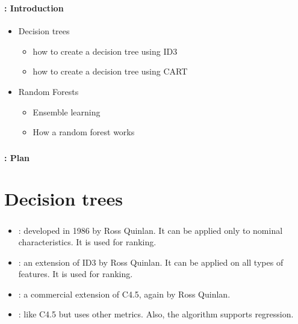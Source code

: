 \documentclass[xcolor=table]{beamer}
\subtitle[DT \& Ensemble]{Decision trees and Ensemble learning}
\begin{document}
	
\begin{frame}
	\frametitle{\inserttitle}
	\framesubtitle{\insertshortsubtitle: Introduction}
	
	\begin{itemize}
		\item Decision trees
		\begin{itemize}
			\item how to create a decision tree using ID3
			\item how to create a decision tree using CART
		\end{itemize}
		\item Random Forests
		\begin{itemize}
			\item Ensemble learning
			\item How a random forest works
		\end{itemize}
	\end{itemize}

\end{frame}


\begin{frame}
	\frametitle{\inserttitle}
	\framesubtitle{\insertshortsubtitle: Plan}
	
	\begin{multicols}{2}
		\tableofcontents
	\end{multicols}
\end{frame}

\section{Decision trees}

\begin{frame}
	\frametitle{\insertshortsubtitle}
	\framesubtitle{\insertsection}
	
	\begin{itemize}
		\item {}: developed in 1986 by Ross Quinlan. It can be applied only to nominal characteristics. It is used for ranking.
		\item {}: an extension of ID3 by Ross Quinlan. It can be applied on all types of features. It is used for ranking.
		\item {}: a commercial extension of C4.5, again by Ross Quinlan.
		\item {}: like C4.5 but uses other metrics. Also, the algorithm supports regression.
	\end{itemize}
	
\end{frame}
\end{document}
